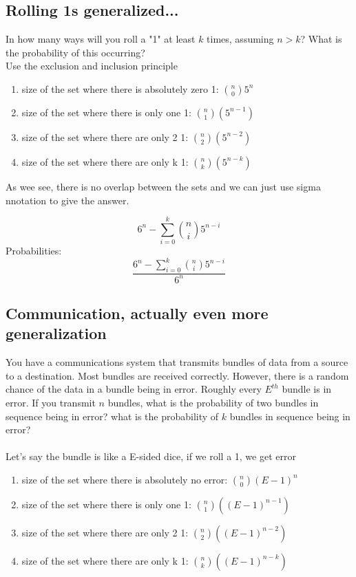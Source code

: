 \documentclass[a4paper,12pt]{article}
\begin{document}
\subsection{Rolling 1s generalized...}
In how many ways will you roll a "1" at least $k$ times, assuming $n > k$? 
What is the probability of this occurring?\\
Use the exclusion and inclusion principle
\begin{enumerate}
  \item{size of the set where there is absolutely zero 1: $\binom{n}{0}5^n$}
  \item{size of the set where there is only one 1: $\binom{n}{1}(5^{n-1})$}
  \item{size of the set where there are only 2 1: $\binom{n}{2}(5^{n-2})$} 
  \item{size of the set where there are only k 1: $\binom{n}{k}(5^{n-k})$} 
\end{enumerate}
As wee see, there is no overlap between the sets and we can just use sigma nnotation to give the answer.

\[ 6^n - \sum ^k _{i=0} \binom{n}{i}5^{n-i} \]
Probabilities: \\
\[\frac{ 6^n - \sum ^k _{i=0} \binom{n}{i}5^{n-i}} {6^n}\]
\subsection{Communication, actually even more generalization}
You have a communications system that transmits bundles of data
from a source to a destination.  Most bundles are received correctly.
However, there is a random chance of the data in a bundle being in
error.  Roughly every $E^{th}$ bundle is in error.  If you transmit
$n$ bundles, what is the probability of two bundles in sequence being
in error?  what is the probability of $k$ bundles in sequence being in
error?\\
\bigskip\\
Let's say the bundle is like a E-sided dice, if we roll a 1, we get error
\begin{enumerate}
  \item{size of the set where there is absolutely no error: $\binom{n}{0}(E-1)^n$}
  \item{size of the set where there is only one 1: $\binom{n}{1}((E-1)^{n-1})$}
  \item{size of the set where there are only 2 1: $\binom{n}{2}((E-1)^{n-2})$} 
  \item{size of the set where there are only k 1: $\binom{n}{k}((E-1)^{n-k})$} 
\end{enumerate}
\end{document}
